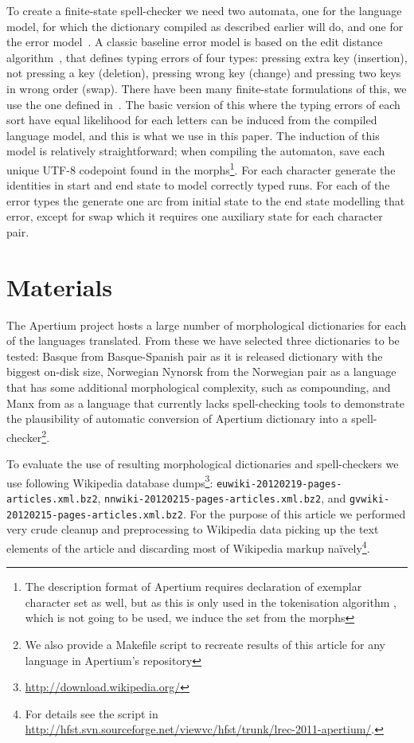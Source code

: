 \documentclass[10pt,a4paper]{article}
\begin{document}
To create a finite-state spell-checker we need two automata, one for the
language model, for which the dictionary compiled as described earlier will do,
and one for the error model~\cite{pirinen/2010/lrec}. A classic baseline error
model is based on the edit distance
algorithm~\cite{levenshtein/1966,damerau/1964}, that defines typing errors of
four types: pressing extra key (insertion), not pressing a key (deletion),
pressing wrong key (change) and pressing two keys in wrong order (swap). There
have been many finite-state formulations of this, we use the one defined
in~\cite{schulz/2002,pirinen/2010/lrec}. The basic version of this where the
typing errors of each sort have equal likelihood for each letters can be
induced from the compiled language model, and this is what we use in this
paper. The induction of this model is relatively straightforward; when
compiling the automaton, save each unique UTF-8 codepoint found in the
morphs\footnote{The description format of Apertium requires declaration of
exemplar character set as well, but as this is only used in the tokenisation
algorithm \cite{garrido-alenda02} , which is not going to be used, we induce
the set from the morphs}. For each character generate the identities in start
and end state to model correctly typed runs. For each of the error types the
generate one arc from initial state to the end state modelling that error,
except for swap which it requires one auxiliary state for each character pair.

\section{Materials}
\label{sec:materials}

The Apertium project hosts a large number of morphological dictionaries for
each of the languages translated. From these we have selected three
dictionaries to be tested: Basque from Basque-Spanish pair as it is 
released dictionary with the biggest on-disk size, Norwegian Nynorsk from the Norwegian pair as a language
that has some additional morphological complexity, such as compounding, and
Manx from  as a language that currently lacks spell-checking tools to
demonstrate the plausibility of automatic conversion of Apertium dictionary
into a spell-checker\footnote{We also provide a Makefile script to
recreate results of this article for any language in Apertium's repository}.

To evaluate the use of resulting morphological dictionaries and spell-checkers
we use following Wikipedia database
dumps\footnote{\url{http://download.wikipedia.org/}}:
\texttt{euwiki-20120219-pages-articles.xml.bz2},
\texttt{nnwiki-20120215-pages-articles.xml.bz2}, and
\texttt{gvwiki-20120215-pages-articles.xml.bz2}. For the purpose of this
article we performed very crude cleanup and preprocessing to Wikipedia data
picking up the text elements of the article and discarding most of Wikipedia
markup naïvely\footnote{For details see the script in
\url{http://hfst.svn.sourceforge.net/viewvc/hfst/trunk/lrec-2011-apertium/}.}.
\end{document}
